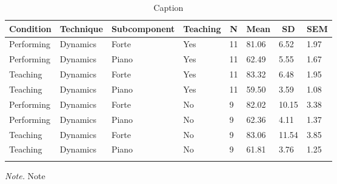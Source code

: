 \documentclass[
  man,floatsintext]{apa6}
\begin{document}
\begin{table}[tbp]

\begin{center}
\begin{threeparttable}

\caption{\label{tab:dyn-teaching-desc-2}Caption}

\begin{tabular}{llllllll}
\toprule
Condition & \multicolumn{1}{c}{Technique} & \multicolumn{1}{c}{Subcomponent} & \multicolumn{1}{c}{Teaching} & \multicolumn{1}{c}{N} & \multicolumn{1}{c}{Mean} & \multicolumn{1}{c}{SD} & \multicolumn{1}{c}{SEM}\\
\midrule
Performing & Dynamics & Forte & Yes & 11 & 81.06 & 6.52 & 1.97\\
Performing & Dynamics & Piano & Yes & 11 & 62.49 & 5.55 & 1.67\\
Teaching & Dynamics & Forte & Yes & 11 & 83.32 & 6.48 & 1.95\\
Teaching & Dynamics & Piano & Yes & 11 & 59.50 & 3.59 & 1.08\\
Performing & Dynamics & Forte & No & 9 & 82.02 & 10.15 & 3.38\\
Performing & Dynamics & Piano & No & 9 & 62.36 & 4.11 & 1.37\\
Teaching & Dynamics & Forte & No & 9 & 83.06 & 11.54 & 3.85\\
Teaching & Dynamics & Piano & No & 9 & 61.81 & 3.76 & 1.25\\
\bottomrule
\addlinespace
\end{tabular}

\begin{tablenotes}[para]
\normalsize{\textit{Note.} Note}
\end{tablenotes}

\end{threeparttable}
\end{center}

\end{table}
\end{document}
